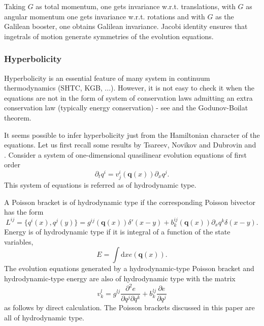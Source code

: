 \documentclass[
10pt, %
a4paper, %
oneside, %
headinclude,footinclude, %
BCOR5mm, %
]{scrartcl}
\newcommand{\diff}{\mathrm{d}}
\newcommand{\qq}{\mathbf{q}}
\begin{document}
Taking $G$ as total momentum, one gets invariance w.r.t. translations, with $G$ as angular momentum one gets invariance w.r.t. rotations and with $G$ as the Galilean booster, one obtains Galilean invariance. Jacobi identity ensures that ingetrals of motion generate symmetries of the evolution equations.

\subsubsection{Hyperbolicity}
Hyperbolicity is an essential feature of many system in continuum thermodynamics (SHTC, KGB, ...). However, it is not easy to check it when the equations are not in the form of system of conservation laws admitting an extra conservation law (typically energy conservation) - see \cite{SHTC-GENERIC} and the Godunov-Boilat theorem.

It seems possible to infer hyperbolicity just from the Hamiltonian character of the equations. Let us first recall some results by Tsareev, Novikov and Dubrovin \cite{Tsarev} and \cite{Novikov}. 
Consider a system of one-dimensional quasilinear evolution equations of first order 
\begin{equation}\label{eqn.hydro.type}
	\partial_t q^i = v^i_j(\qq(x)) \partial_x q^j.
\end{equation}
This system of equations is referred as of hydrodynamic type. 

A Poisson bracket is of hydrodynamic type if the corresponding Poisson bivector has the form
\begin{equation}\label{eqn.bivector.hydro}
	L^{ij} = \{q^i(x),q^j(y)\} = g^{ij}(\qq(x)) \delta'(x-y) + b^{ij}_k (\qq(x)) \partial_x q^k \delta(x-y).
\end{equation}
Energy is of hydrodynamic type if it is integral of a function of the state variables, 
\begin{equation}
	E = \int \diff x e(\qq(x)).
\end{equation}
The evolution equations generated by a hydrodynamic-type Poisson bracket and hydrodynamic-type energy are also of hydrodynamic type with the matrix
\begin{equation}
	v^l_k = g^{lj} \frac{\partial^2 e}{\partial q^j \partial q^k} + b^{lj}_k \frac{\partial e}{\partial q^j}
\end{equation}
as follows by direct calculation.
The Poisson brackets discussed in this paper are all of hydrodynamic type.
\end{document}
